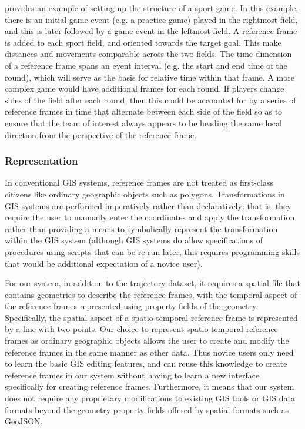  provides an example of setting up the structure of a sport game. In this example, there is an initial game event (e.g. a practice game) played in the rightmost field, and this is later followed by a game event in the leftmost field. A reference frame is added to each sport field, and oriented towards the target goal. This make distances and movements comparable across the two fields. The time dimension of a reference frame spans an event interval (e.g. the start and end time of the round), which will serve as the basis for relative time within that frame. A more complex game would have additional frames for each round. If players change sides of the field after each round, then this could be accounted for by a series of reference frames in time that alternate between each side of the field so as to ensure that the team of interest always appears to be heading the same local direction from the perspective of the reference frame.









\subsubsection{Representation}

In conventional GIS systems, reference frames are not treated as first-class citizens like ordinary geographic objects such as polygons. Transformations in GIS systems are performed imperatively rather than declaratively: that is, they require the user to manually enter the coordinates and apply the transformation rather than providing a means to symbolically represent the transformation within the GIS system (although GIS systems do allow specifications of procedures using scripts that can be re-run later, this requires programming skills that would be additional expectation of a novice user).

For our system, in addition to the trajectory dataset, it requires a spatial file that contains geometries to describe the reference frames, with the temporal aspect of the reference frames represented using property fields of the geometry. Specifically, the spatial aspect of a spatio-temporal reference frame is represented by a line with two points. Our choice to represent spatio-temporal reference frames as ordinary geographic objects allows the user to create and modify the reference frames in the same manner as other data. Thus novice users only need to learn the basic GIS editing features, and can reuse this knowledge to create reference frames in our system without having to learn a new interface specifically for creating reference frames. Furthermore, it means that our system does not require any proprietary modifications to existing GIS tools or GIS data formats beyond the geometry property fields offered by spatial formats such as GeoJSON.


